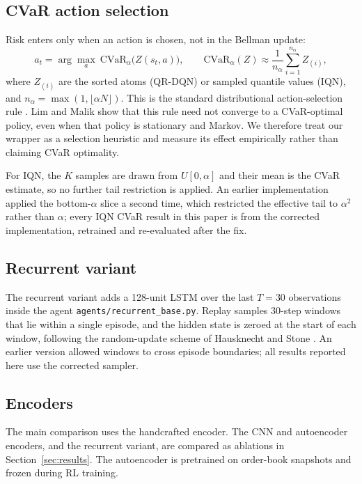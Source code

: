 \documentclass[10pt,twocolumn]{article}
\begin{document}
\subsection{CVaR action selection}
\label{sec:cvar}
Risk enters only when an action is chosen, not in the Bellman update:
\begin{equation}
  a_t=\arg\max_{a}\ \mathrm{CVaR}_\alpha\big(Z(s_t,a)\big),\qquad
  \mathrm{CVaR}_\alpha(Z)\approx\frac{1}{n_\alpha}\sum_{i=1}^{n_\alpha}Z_{(i)},
\end{equation}
where $Z_{(i)}$ are the sorted atoms (QR-DQN) or sampled quantile values (IQN), and $n_\alpha=\max(1,\lfloor\alpha N\rfloor)$. This is the standard distributional action-selection rule \citep{dabney2018qr}. Lim and Malik \citep{lim2022} show that this rule need not converge to a CVaR-optimal policy, even when that policy is stationary and Markov. We therefore treat our wrapper as a selection heuristic and measure its effect empirically rather than claiming CVaR optimality.

For IQN, the $K$ samples are drawn from $U[0,\alpha]$ and their mean is the CVaR estimate, so no further tail restriction is applied. An earlier implementation applied the bottom-$\alpha$ slice a second time, which restricted the effective tail to $\alpha^2$ rather than $\alpha$; every IQN CVaR result in this paper is from the corrected implementation, retrained and re-evaluated after the fix.

\subsection{Recurrent variant}
The recurrent variant adds a 128-unit LSTM over the last $T=30$ observations inside the agent \texttt{agents/recurrent\_base.py}. Replay samples 30-step windows that lie within a single episode, and the hidden state is zeroed at the start of each window, following the random-update scheme of Hausknecht and Stone \citep{hausknecht2015}. An earlier version allowed windows to cross episode boundaries; all results reported here use the corrected sampler.

\subsection{Encoders}
The main comparison uses the handcrafted encoder. The CNN and autoencoder encoders, and the recurrent variant, are compared as ablations in Section~\ref{sec:results}. The autoencoder is pretrained on order-book snapshots and frozen during RL training.
\end{document}
